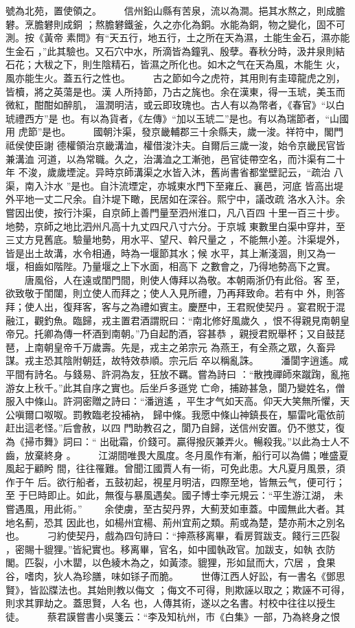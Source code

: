 \documentclass{ctexart}
\begin{document}
號為北苑，置使領之。 　　信州鉛山縣有苦泉，流以為澗。挹其水熬之，則成膽礬。烹膽礬則成銅 ；熬膽礬鐵釜，久之亦化為銅。水能為銅，物之變化，固不可測。按《黃帝 素問》有``天五行，地五行，土之所在天為濕，土能生金石，濕亦能生金石 ，''此其驗也。又石穴中水，所滴皆為鐘乳、殷孽。春秋分時，汲井泉則結 石花；大秡之下，則生陰精石，皆濕之所化也。如木之气在天為風，木能生 火，風亦能生火。蓋五行之性也。 　　古之節如今之虎符，其用則有圭璋龍虎之別，皆櫝，將之英蕩是也。漢 人所持節，乃古之旄也。余在漢東，得一玉琥，美玉而微紅，酣酣如醉肌， 溫潤明洁，或云即玫瑰也。古人有以為幣者，《春官》``以白琥禮西方''是 也。有以為貨者，《左傳》``加以玉琥二''是也。有以為瑞節者，``山國用 虎節''是也。 　　國朝汴渠，發京畿輔郡三十余縣夫，歲一浚。祥符中，閣門祗侯使臣謝 德權領治京畿溝洫，權借浚汴夫。自爾后三歲一浚，始令京畿民官皆兼溝洫 河道，以為常職。久之，治溝洫之工漸弛，邑官徒帶空名，而汴渠有二十年 不浚，歲歲堙淀。异時京師溝渠之水皆入沐，舊尚書省都堂壁記云，``疏治 八渠，南入汴水 ''是也。自汴流堙定，亦城東水門下至雍丘、襄邑，河底 皆高出堤外平地一丈二尺余。自汴堤下瞰，民居如在深谷。熙宁中，議改疏 洛水入汴。余嘗因出使，按行汴渠，自京師上善門量至泗州淮口，凡八百四 十里一百三十步。地勢，京師之地比泗州凡高十九丈四尺八寸六分。于京城 東數里白渠中穿井，至三丈方見舊底。驗量地勢，用水平、望尺、斡尺量之 ，不能無小差。汴渠堤外，皆是出土故溝，水令相通，時為一堰節其水；候 水平，其上漸淺涸，則又為一堰，相齒如階陛。乃量堰之上下水面，相高下 之數會之，乃得地勢高下之實。 　　唐風俗，人在遠或閨門間，則使人傳拜以為敬。本朝兩浙仍有此俗。客 至，欲致敬于閨闥，則立使人而拜之；使人入見所禮，乃再拜致命。若有中 外，則答拜；使人出，復拜客，客与之為禮如賓主。慶歷中，王君貺使契丹 。宴君貺于混融江，觀釣魚。臨歸，戎主置君酒謂貺曰：``南北修好風歲久 ，恨不得親見南朝皇帝兄。托卿為傳一杯酒到南朝。''乃自起酌酒，容甚恭 ，親授君貺舉杯；又自鼓琵琶，上南朝皇帝千万歲壽。先是，戎主之弟宗元 為燕王，有全燕之眾，久畜异謀。戎主恐其陰附朝廷，故特效恭順。宗元后 卒以稱亂誅。 　　潘閬字逍遙。咸平間有詩名。与錢易、許洞為友，狂放不羈。嘗為詩曰 ：``散拽禪師來蹴踘，亂拖游女上秋千。''此其自序之實也。后坐戶多遜党 亡命，捕跡甚急，閬乃變姓名，僧服入中條山。許洞密贈之詩曰：``潘逍遙 ，平生才气如天高。仰天大笑無所懼，天公嗔爾口呶呶。罰教臨老投補衲， 歸中條。我愿中條山神鎮長在，驅雷叱電依前赶出這老怪。''后會赦，以四 門助教召之，閬乃自歸，送信州安置。仍不懲艾，復為《掃市舞》詞曰：`` 出砒霜，价錢可。贏得撥灰兼弄火。暢殺我。''以此為士人不齒，放棄終身 。 　　江湖間唯畏大風度。冬月風作有漸，船行可以為備；唯盛夏風起于顧盻 間，往往罹難。曾聞江國賈人有一術，可免此患。大凡夏月風景，須作于午 后。欲行船者，五鼓初起，視星月明洁，四際至地，皆無云气，便可行；至 于巳時即止。如此，無復与暴風遇矣。國子博士李元規云：``平生游江湖， 未嘗遇風，用此術。'' 　　余使虜，至古契丹界，大薊茇如車蓋。中國無此大者。其地名薊，恐其 因此也，如楊州宜楊、荊州宜荊之類。荊或為楚，楚亦荊木之別名也。 　　刁約使契丹，戲為四句詩曰：``抻燕移离畢，看房賀跋支。餞行三匹裂 ，密賜十貔狸。''皆紀實也。移离畢，官名，如中國執政官。加跋支，如執 衣防閣。匹裂，小木罌，以色綾木為之，如黃漆。貔狸，形如鼠而大，穴居 ，食果谷，嗜肉，狄人為珍膳，味如铩子而脆。 　　世傳江西人好訟，有一書名《鄧思賢》，皆訟牒法也。其始則教以侮文 ；侮文不可得，則欺誣以取之；欺誣不可得，則求其罪劫之。蓋思賢，人名 也，人傳其術，遂以之名書。村校中往往以授生徒。 　　蔡君謨嘗書小吳箋云：``李及知杭州，市《白集》一部，乃為終身之恨 
\end{document}
